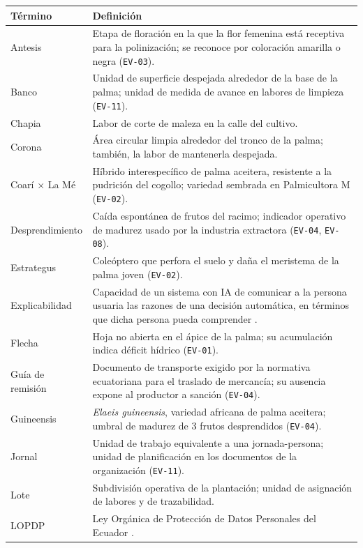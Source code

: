 \documentclass[11pt,a4paper]{article}
\newcommand{\id}[1]{\texttt{\begingroup\hyphenpenalty=10000\relax#1\endgroup}}
\renewcommand{\id}[1]{\texttt{#1}}
\begin{document}
\begin{longtable}{|L{3.6cm}|L{11.8cm}|}
\hline
{}\textbf{Término} & \textbf{Definición} \\
\hline
\endhead
Antesis & Etapa de floración en la que la flor femenina está receptiva para la polinización; se reconoce por coloración amarilla o negra (\id{EV-03}). \\ \hline
Banco & Unidad de superficie despejada alrededor de la base de la palma; unidad de medida de avance en labores de limpieza (\id{EV-11}). \\ \hline
Chapia & Labor de corte de maleza en la calle del cultivo. \\ \hline
Corona & Área circular limpia alrededor del tronco de la palma; también, la labor de mantenerla despejada. \\ \hline
Coarí × La Mé & Híbrido interespecífico de palma aceitera, resistente a la pudrición del cogollo; variedad sembrada en Palmicultora M (\id{EV-02}). \\ \hline
Desprendimiento & Caída espontánea de frutos del racimo; indicador operativo de madurez usado por la industria extractora (\id{EV-04}, \id{EV-08}). \\ \hline
Estrategus & Coleóptero que perfora el suelo y daña el meristema de la palma joven (\id{EV-02}). \\ \hline
Explicabilidad & Capacidad de un sistema con IA de comunicar a la persona usuaria las razones de una decisión automática, en términos que dicha persona pueda comprender \cite{chazette2020}. \\ \hline
Flecha & Hoja no abierta en el ápice de la palma; su acumulación indica déficit hídrico (\id{EV-01}). \\ \hline
Guía de remisión & Documento de transporte exigido por la normativa ecuatoriana para el traslado de mercancía; su ausencia expone al productor a sanción (\id{EV-04}). \\ \hline
Guineensis & \emph{Elaeis guineensis}, variedad africana de palma aceitera; umbral de madurez de 3 frutos desprendidos (\id{EV-04}). \\ \hline
Jornal & Unidad de trabajo equivalente a una jornada-persona; unidad de planificación en los documentos de la organización (\id{EV-11}). \\ \hline
Lote & Subdivisión operativa de la plantación; unidad de asignación de labores y de trazabilidad. \\ \hline
LOPDP & Ley Orgánica de Protección de Datos Personales del Ecuador \cite{lopdp}. \\ \hline

\end{longtable}
\end{document}

